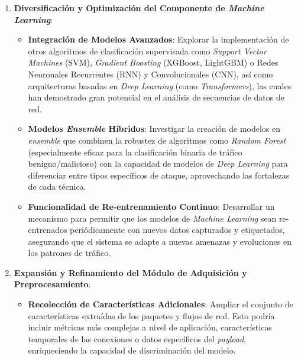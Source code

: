 \begin{enumerate}

    \item\textbf{Diversificación y Optimización del Componente de \textit{Machine Learning}}:
    \begin{itemize}
    
        \item\textbf{Integración de Modelos Avanzados}: Explorar la implementación de otros algoritmos de clasificación supervisada como \textit{Support Vector Machines} (SVM), \textit{Gradient Boosting} (XGBoost, LightGBM) o Redes Neuronales Recurrentes (RNN) y Convolucionales (CNN), así como arquitecturas basadas en \textit{Deep Learning} (como \textit{Transformers}), las cuales han demostrado gran potencial en el análisis de secuencias de datos de red.
        
        \item\textbf{Modelos \textit{Ensemble} Híbridos}: Investigar la creación de modelos en \textit{ensemble} que combinen la robustez de algoritmos como \textit{Random Forest} (especialmente eficaz para la clasificación binaria de tráfico benigno/malicioso) con la capacidad de modelos de \textit{Deep Learning} para diferenciar entre tipos específicos de ataque, aprovechando las fortalezas de cada técnica.
        
        \item\textbf{Funcionalidad de Re-entrenamiento Continuo}: Desarrollar un mecanismo para permitir que los modelos de \textit{Machine Learning} sean re-entrenados periódicamente con nuevos datos capturados y etiquetados, asegurando que el sistema se adapte a nuevas amenazas y evoluciones en los patrones de tráfico.
    
    \end{itemize}

    \item\textbf{Expansión y Refinamiento del Módulo de Adquisición y Preprocesamiento}:

    \begin{itemize}

        \item\textbf{Recolección de Características Adicionales}: Ampliar el conjunto de características extraídas de los paquetes y flujos de red. Esto podría incluir métricas más complejas a nivel de aplicación, características temporales de las conexiones o datos específicos del \textit{payload}, enriqueciendo la capacidad de discriminación del modelo.
        

\end{itemize}
\end{enumerate}
